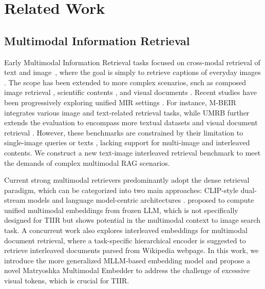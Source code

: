 \section{Related Work}
\subsection{Multimodal Information Retrieval}
Early Multimodal Information Retrieval tasks focused on cross-modal retrieval of text and image~\citep{DBLP:conf/ijcai/CaoLLNZ22}, where the goal is simply to retrieve captions of everyday images \cite{lin2014microsoft,young-etal-2014-image}.
The scope has been extended to more complex scenarios, such as composed image retrieval \cite{liu2021image}, scientific contents \cite{wu-etal-2024-scimmir}, and visual documents \cite{ma-etal-2024-unifying,faysse2024colpali}.
Recent studies have been progressively exploring unified MIR settings \cite{zhou-etal-2024-marvel}.
For instance, M-BEIR \cite{DBLP:conf/eccv/WeiCCHZFRC24} integrates various image and text-related retrieval tasks, while UMRB \cite{zhang2024gme} further extends the evaluation to encompass more textual datasets and visual document retrieval \cite{faysse2024colpali}.
However, these benchmarks are constrained by their limitation to single-image queries or texts \cite{zhang2024gme}, lacking support for multi-image and interleaved contents.
We construct a new text-image interleaved retrieval benchmark to meet the demands of complex multimodal RAG scenarios.

Current strong multimodal retrievers predominantly adopt the dense retrieval paradigm, which can be categorized into two main approaches: CLIP-style dual-stream models \cite{liu2023universal,koukounas2024jinaclipv2,nussbaum2024nomic} and language model-centric architectures \cite{lin-etal-2024-preflmr,zhou-etal-2024-vista,jiang2024e5}.
\citet{wang-etal-2024-unified} proposed to compute unified multimodal embeddings from frozen LLM, which is not specifically designed for TIIR but shows potential in the multimodal context to image search task.
A concurrent work \cite{lee2024unified} also explores interleaved embeddings for multimodal document retrieval, where a task-specific hierarchical encoder is suggested to retrieve interleaved documents parsed from Wikipedia webpage.
In this work, we introduce the more generalized MLLM-based embedding model and propose a novel Matryoshka Multimodal Embedder to address the challenge of excessive visual tokens, which is crucial for TIIR.


